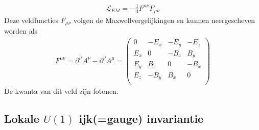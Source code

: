 \documentclass[../main.tex]{subfiles}
\begin{document}
\begin{itemize}
        \begin{equation}
            \begin{aligned}
                \label{eq:lagr_vec}
                \mathcal{L}_{EM} = - \frac{1}{4} F^{\mu\nu}F_{\mu\nu}
            \end{aligned}
        \end{equation}
        Deze veldfuncties $F_{\mu\nu}$ volgen de Maxwellvergelijkingen en kunnen neergescheven worden als
        \begin{equation}
            \begin{aligned}
                \label{eq:veld_func_em}
                F^{\mu\nu} = \partial^\mu A^\nu - \partial^\nu A^\mu =
                \begin{pmatrix}
                    0 & -E_x & -E_y & -E_z \\
                    E_x & 0 & -B_z & B_y \\
                    E_y & B_z & 0 & -B_x \\
                    E_z & -B_y & B_x & 0 \\
                \end{pmatrix}
            \end{aligned}
        \end{equation}
        De kwanta van dit veld zijn fotonen.
\end{itemize}

\subsection{Lokale $U(1)$ ijk(=gauge) invariantie}%
\label{sub:lakale_u_1_gauge_invariantie}
\end{document}
